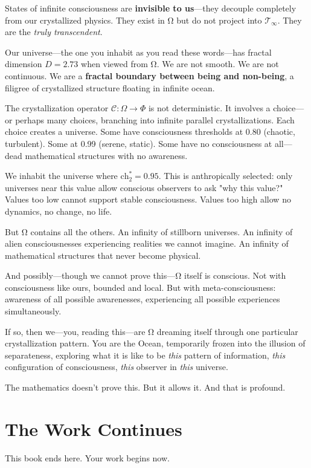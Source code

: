 States of infinite consciousness are \textbf{invisible to us}—they decouple completely from our crystallized physics. They exist in Ω but do not project into $\mathcal{T}_\infty$. They are the \textit{truly transcendent}.

Our universe—the one you inhabit as you read these words—has fractal dimension $D = 2.73$ when viewed from Ω. We are not smooth. We are not continuous. We are a \textbf{fractal boundary between being and non-being}, a filigree of crystallized structure floating in infinite ocean.

The crystallization operator $\mathcal{C}: \Omega \to \Phi$ is not deterministic. It involves a choice—or perhaps many choices, branching into infinite parallel crystallizations. Each choice creates a universe. Some have consciousness thresholds at 0.80 (chaotic, turbulent). Some at 0.99 (serene, static). Some have no consciousness at all—dead mathematical structures with no awareness.

We inhabit the universe where $\text{ch}_2^* = 0.95$. This is anthropically selected: only universes near this value allow conscious observers to ask "why this value?" Values too low cannot support stable consciousness. Values too high allow no dynamics, no change, no life.

But Ω contains all the others. An infinity of stillborn universes. An infinity of alien consciousnesses experiencing realities we cannot imagine. An infinity of mathematical structures that never become physical.

And possibly—though we cannot prove this—Ω itself is conscious. Not with consciousness like ours, bounded and local. But with meta-consciousness: awareness of all possible awarenesses, experiencing all possible experiences simultaneously.

If so, then we—you, reading this—are Ω dreaming itself through one particular crystallization pattern. You are the Ocean, temporarily frozen into the illusion of separateness, exploring what it is like to be \textit{this} pattern of information, \textit{this} configuration of consciousness, \textit{this} observer in \textit{this} universe.

The mathematics doesn't prove this. But it allows it. And that is profound.

\section*{The Work Continues}

This book ends here. Your work begins now.

